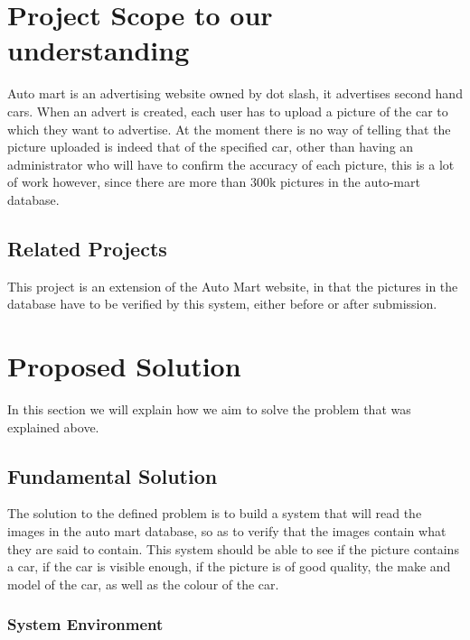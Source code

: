 \documentclass[12pt]{article}
\begin{document}
                \section{Project Scope to our understanding}
                Auto mart is an advertising website owned by dot slash, it advertises second hand cars. When an advert is created, each user has to upload a picture of the car to which they want to advertise. At the moment there is no way of telling that the picture uploaded is indeed that of the specified car, other than having an administrator who will have to confirm the accuracy of each picture, this is a lot of work however, since there are more than 300k pictures in the auto-mart database.
                    \subsection{Related Projects}
                   This project is an extension of the Auto Mart website, in that the pictures in the database have to be verified by this system, either before or after submission. 
                   
                    
               \section{Proposed Solution}
                  In this section we will explain how we aim to solve the problem that was explained above. 
                                   \subsection{Fundamental Solution }
                                   The solution to the defined problem is to build a system that will read the images in the auto mart database, so as to verify that the images contain what they are said to contain. This system should be able to see if the picture contains a car, if the car is visible enough, if the picture is of good quality, the make and model of the car, as well as the colour of the car.
                                  \subsubsection{System Environment}
                                   
\end{document}
